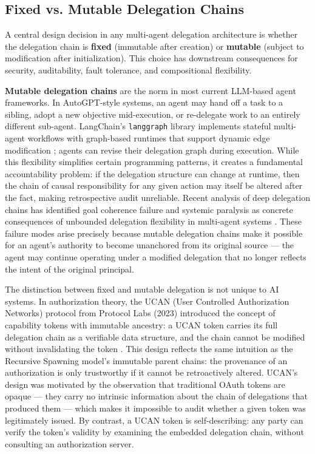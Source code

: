 \subsection{Fixed vs. Mutable Delegation Chains}
\label{sec:delegation}

A central design decision in any multi-agent delegation architecture is whether the delegation chain is \textbf{fixed} (immutable after creation) or \textbf{mutable} (subject to modification after initialization). This choice has downstream consequences for security, auditability, fault tolerance, and compositional flexibility.

\textbf{Mutable delegation chains} are the norm in most current LLM-based agent frameworks. In AutoGPT-style systems, an agent may hand off a task to a sibling, adopt a new objective mid-execution, or re-delegate work to an entirely different sub-agent. LangChain's \texttt{langgraph} library implements stateful multi-agent workflows with graph-based runtimes that support dynamic edge modification \cite{heavybit2025multiagent}; agents can revise their delegation graph during execution. While this flexibility simplifies certain programming patterns, it creates a fundamental accountability problem: if the delegation structure can change at runtime, then the chain of causal responsibility for any given action may itself be altered after the fact, making retrospective audit unreliable. Recent analysis of deep delegation chains has identified goal coherence failure and systemic paralysis as concrete consequences of unbounded delegation flexibility in multi-agent systems \cite{multi_agent_coordination_failures}. These failure modes arise precisely because mutable delegation chains make it possible for an agent's authority to become unanchored from its original source — the agent may continue operating under a modified delegation that no longer reflects the intent of the original principal.

The distinction between fixed and mutable delegation is not unique to AI systems. In authorization theory, the UCAN (User Controlled Authorization Networks) protocol from Protocol Labs (2023) introduced the concept of capability tokens with immutable ancestry: a UCAN token carries its full delegation chain as a verifiable data structure, and the chain cannot be modified without invalidating the token \cite{UCAN}. This design reflects the same intuition as the Recursive Spawning model's immutable parent chains: the provenance of an authorization is only trustworthy if it cannot be retroactively altered. UCAN's design was motivated by the observation that traditional OAuth tokens are opaque — they carry no intrinsic information about the chain of delegations that produced them — which makes it impossible to audit whether a given token was legitimately issued. By contrast, a UCAN token is self-describing: any party can verify the token's validity by examining the embedded delegation chain, without consulting an authorization server.

